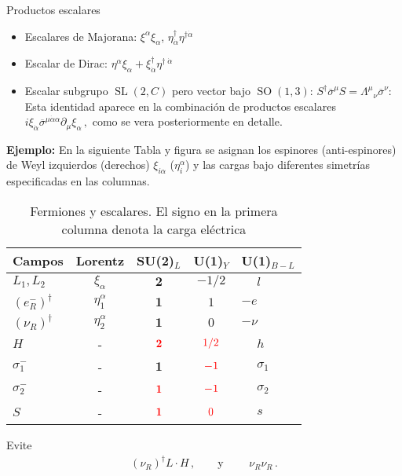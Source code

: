 \begin{frame}
Productos escalares
\begin{itemize}
\item Escalares de Majorana: $\xi^{\alpha}\xi_{\alpha}$, $\eta^{\dagger}_{ \dot{\alpha}}\eta^{\dagger \dot{\alpha}}$
\item Escalar de Dirac: $\eta^{\alpha}\xi_{\alpha}+ \xi^{\dagger}_{\dot{\alpha}}\eta^{\dagger\;\dot{\alpha  }} $


 \item Escalar subgrupo $\operatorname{SL}(2,C)$ pero vector bajo $\operatorname{SO}(1,3)$: $ S^\dagger\overline{\sigma}^\mu S={\Lambda^\mu}_\nu\overline{\sigma}^\nu$: Esta identidad aparece en la combinación de productos escalares
  $i\xi_{\dot{\alpha}} \overline{\sigma}^{\mu\dot{\alpha} \alpha} \partial_{\mu} \xi_{\alpha} \,,$
como se vera posteriormente en detalle.
\end{itemize}


\end{frame}

\noindent
\textbf{Ejemplo:} 
En la siguiente Tabla y figura se asignan los espinores (anti-espinores) de Weyl izquierdos (derechos) $\xi_{i\alpha}$ ($\eta^{\alpha}_i$)  y las cargas bajo diferentes simetrías especificadas en las columnas.


\begin{frame}

\begin{table}
  \centering
    \begin{tabular}{|l|c|c|c|l|}\hline
    Campos &Lorentz& SU(2)$_{L}$ & U(1)$_Y$ & U(1)$_{B-L}$\\\hline
    $L_1,L_2$ & $\xi_{\alpha}$& $\mathbf{2}$ & $-1/2$&$\phantom{-}l$\\
    $\left(e_R^{-}\right)^{\dagger}$ & $\eta_1^\alpha$& $\mathbf{1}$ & $1$&$-e$\\
    $\left(\nu_R\right)^{\dagger}$ &$\eta_2^\alpha$ & $\mathbf{1}$ & $0$&$-\nu$\\
     $H$  &-&$\color{red}\mathbf{2}$&$\color{red}1/2$&$\phantom{-}h$\\
     $\sigma_1^-$ &-&$\mathbf{1}$&$\color{red}-1$&$\phantom{-}\sigma_1$\\
     $\sigma_2^-$ &-&$\color{red}\mathbf{1}$&$\color{red}-1$&$\phantom{-}\sigma_2$\\
     $S$ &-&$\color{red}\mathbf{1}$&${\color{red}0}$&$\phantom{-}s$\\\hline
  \end{tabular}\hspace{1cm} 
  \caption{Fermiones y escalares. El signo en la primera columna denota la carga eléctrica }
  \label{tab:fs}
\end{table}


Evite
\begin{align}
  \left( \nu_R \right)^{\dagger} L\cdot H\,,\qquad\text{y }\qquad \nu_R \nu_R\,.
\end{align}
\end{frame}

